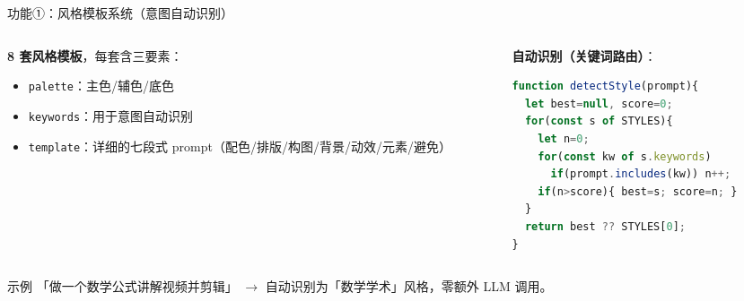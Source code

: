 \documentclass[aspectratio=169,11pt]{beamer}
\begin{document}
\begin{frame}[fragile]{功能①：风格模板系统（意图自动识别）}
  \begin{columns}[T]
    \begin{column}{0.55\textwidth}
      \textbf{8 套风格模板}，每套含三要素：
      \begin{itemize}
        \item \texttt{palette}：主色/辅色/底色
        \item \texttt{keywords}：用于意图自动识别
        \item \texttt{template}：详细的七段式 prompt（配色/排版/构图/背景/动效/元素/避免）
      \end{itemize}
    \end{column}
    \begin{column}{0.45\textwidth}
      \textbf{自动识别（关键词路由）}：
      \begin{lstlisting}[language=JavaScript, basicstyle=\ttfamily\tiny]
function detectStyle(prompt){
  let best=null, score=0;
  for(const s of STYLES){
    let n=0;
    for(const kw of s.keywords)
      if(prompt.includes(kw)) n++;
    if(n>score){ best=s; score=n; }
  }
  return best ?? STYLES[0];
}
      \end{lstlisting}
    \end{column}
  \end{columns}
  \vspace{0.4em}
  \begin{exampleblock}{示例}
    「做一个数学公式讲解视频并剪辑」 $\rightarrow$ 自动识别为「数学学术」风格，零额外 LLM 调用。
  \end{exampleblock}
\end{frame}
\end{document}
